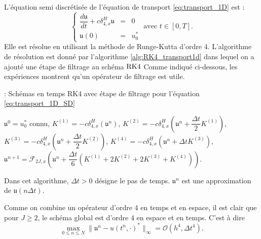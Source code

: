 L'équation semi discrétisée de l'équation de transport \eqref{eq:transport_1D} est :
\begin{equation}
\left\lbrace
\begin{array}{rcl}
\dfrac{d \mathfrak{u}}{dt} + c \delta_{4,x}^H \mathfrak{u}& = &0 \\
\mathfrak{u}(0) & = & u_0^*
\end{array}
\text{ avec } t \in [0,T].
\right.
\label{eq:transport_1D_SD}
\end{equation}
Elle est résolue en utilisant la méthode de Runge-Kutta d'ordre 4. L'algorithme de résolution est donné par l'algorithme \ref{alg:RK4_transport1d} dans lequel on a ajouté une étape de filtrage au schéma $\RK4$ Comme indiqué ci-dessous, les expériences montrent qu'un opérateur de filtrage \cite{Visbal2002} est utile.
\begin{center}
\begin{minipage}[H]{12cm}
  \begin{algorithm}[H]
    \caption{: Schémas en temps RK4 avec étape de filtrage pour l'équation \eqref{eq:transport_1D_SD}}\label{alg:RK4_transport1d}
    \begin{algorithmic}[1]
    \State $\mathfrak{u}^0 = u_0^*$ connu,
             \State  $K^{(1)} = - c \delta_{4,x}^H \left( \mathfrak{u}^n \right)$,
             \State  $K^{(2)} = - c \delta_{4,x}^H \left( \mathfrak{u}^n + \dfrac{\Delta t}{2} K^{(1)}\right)$,
             \State  $K^{(3)} = - c \delta_{4,x}^H \left( \mathfrak{u}^n + \dfrac{\Delta t}{2} K^{(2)}\right)$,
             \State  $K^{(4)} = - c \delta_{4,x}^H \left( \mathfrak{u}^n + \Delta t K^{(3)}\right)$,  
             \State  $\mathfrak{u}^{n+1} = \mathcal{F}_{2J,x}\left( \mathfrak{u}^n  + \dfrac{\Delta t}{6} \left( K^{(1)} + 2 K^{(2)} + 2 K^{(3)} + K^{(4)} \right) \right)$.
            \EndFor
    \end{algorithmic}
    \end{algorithm}
\end{minipage}
\end{center}
Dans cet algorithme, $\Delta t > 0$ désigne le pas de temps. $\mathfrak{u}^n$ est une approximation de $\mathfrak{u}(n \Delta t)$.

Comme on combine un opérateur d'ordre 4 en temps et en espace, il est clair que pour $J \geq 2$, le schéma global est d'ordre 4 en espace et en temps. C'est à dire
\begin{equation}
\max_{0 \leq n \leq N} \| \mathfrak{u}^n - u(t^n,\cdot)^* \|_{\infty} = \mathcal{O} \left( h^4 , \Delta t^4 \right).
\end{equation}




